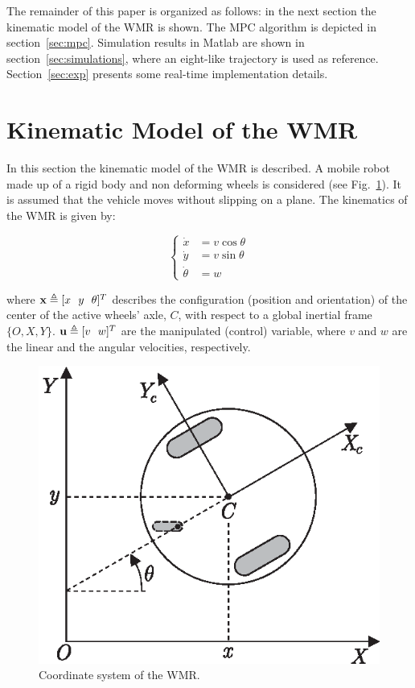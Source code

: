 \documentclass[conference]{IEEEtran} %
\begin{document}
The remainder of this paper is organized as follows: in the next section the kinematic model of the WMR is shown. The MPC algorithm is depicted in section~\ref{sec:mpc}. Simulation results in {\sc Matlab} are shown in section~\ref{sec:simulations}, where an eight-like trajectory is used as reference. Section~\ref{sec:exp} presents some real-time implementation details.


\section{Kinematic Model of the WMR}
\label{sec:model}

In this section the kinematic model of the WMR is described. A mobile robot
made up of a rigid body and non deforming wheels is considered (see Fig.~\ref{fig:robot}). It is assumed that the vehicle moves without slipping on a plane. The kinematics of the WMR is given by:

\begin{equation}
\label{eqn:model}
	\left\{
		\begin{aligned}
			\dot x	  &= v\cos\theta \\
			\dot y	  &= v\sin\theta \\
			\dot \theta &= w
		\end{aligned}
	\right.
\end{equation}

\noindent where ${\bf x}\triangleq[x~~y~~\theta]^T$ describes the configuration (position and orientation) of the center of the active wheels' axle, $C$, with respect to a global inertial frame $\{O,X,Y\}$. ${\bf u}\triangleq[v~~w]^T$ are the manipulated (control) variable, where $v$ and $w$ are the linear and the angular velocities, respectively.

\begin{figure}[htbp]
\begin{center}
    \includegraphics[width=0.67\linewidth]{Figures/robot.eps}
    \caption{Coordinate system of the WMR.}
    \label{fig:robot}
\end{center}
\end{figure}
\end{document}

